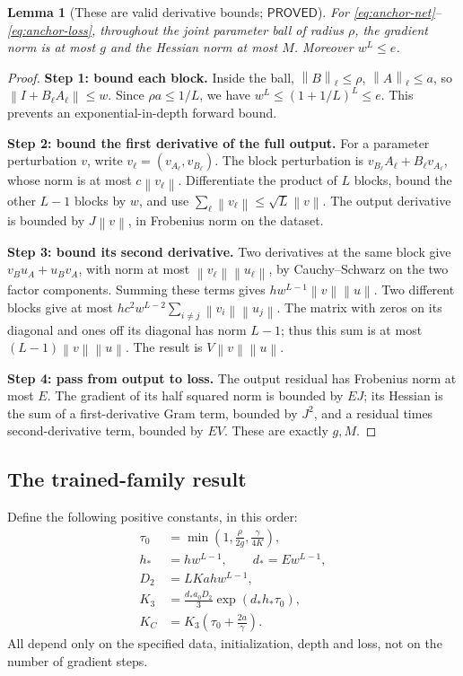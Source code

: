 \documentclass[12pt,a4paper]{article}
\theoremstyle{readable}
\newtheorem{lemma}[theorem]{Lemma}
\theoremstyle{definition}\newtheorem{example}[theorem]{Example}
\newcommand{\norm}[1]{\left\|#1\right\|}
\newcommand{\PP}{\mathsf{PROVED}}\newcommand{\FF}{\mathsf{FALSE}}
\begin{document}
\begin{lemma}[These are valid derivative bounds; \(\PP\)]\label{lem:constants}
For \eqref{eq:anchor-net}--\eqref{eq:anchor-loss}, throughout the joint parameter ball of radius \(\rho\), the gradient norm is at most \(g\) and the Hessian norm at most \(M\). Moreover \(w^L\le e\).
\end{lemma}
\begin{proof}
\textbf{Step 1: bound each block.} Inside the ball, \(\norm B_\ell\le\rho\), \(\norm A_\ell\le a\), so \(\norm{I+B_\ell A_\ell}\le w\). Since \(\rho a\le1/L\), we have \(w^L\le(1+1/L)^L\le e\). This prevents an exponential-in-depth forward bound.

\textbf{Step 2: bound the first derivative of the full output.} For a parameter perturbation \(v\), write \(v_\ell=(v_{A_\ell},v_{B_\ell})\). The block perturbation is
\(v_{B_\ell}A_\ell+B_\ell v_{A_\ell}\), whose norm is at most \(c\norm{v_\ell}\). Differentiate the product of \(L\) blocks, bound the other \(L-1\) blocks by \(w\), and use \(\sum_\ell\norm{v_\ell}\le\sqrt L\norm v\). The output derivative is bounded by \(J\norm v\), in Frobenius norm on the dataset.

\textbf{Step 3: bound its second derivative.} Two derivatives at the same block give
\(v_Bu_A+u_Bv_A\), with norm at most \(\norm{v_\ell}\norm{u_\ell}\), by Cauchy--Schwarz on the two factor components. Summing these terms gives \(hw^{L-1}\norm v\norm u\). Two different blocks give at most
\(hc^2w^{L-2}\sum_{i\ne j}\norm{v_i}\norm{u_j}\).
The matrix with zeros on its diagonal and ones off its diagonal has norm \(L-1\); thus this sum is at most \((L-1)\norm v\norm u\). The result is \(V\norm v\norm u\).

\textbf{Step 4: pass from output to loss.} The output residual has Frobenius norm at most \(E\). The gradient of its half squared norm is bounded by \(EJ\); its Hessian is the sum of a first-derivative Gram term, bounded by \(J^2\), and a residual times second-derivative term, bounded by \(EV\). These are exactly \(g,M\).
\end{proof}

\subsection{The trained-family result}
Define the following positive constants, in this order:
\begin{align*}
\tau_0&=\min\left(1,\frac{\rho}{2g},\frac{\gamma}{4K}\right),\\
h_*&=h w^{L-1},\qquad d_*=Ew^{L-1},\\
D_2&=LK a h w^{L-1},\\
K_3&=\frac{d_*a_0D_2}{3}\exp(d_*h_*\tau_0),\\
K_C&=K_3\left(\tau_0+\frac{2a}{\gamma}\right).
\end{align*}
All depend only on the specified data, initialization, depth and loss, not on the number of gradient steps.
\end{document}
